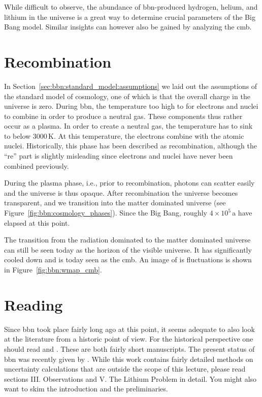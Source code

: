 While difficult to observe, the abundance of \ac{bbn}-produced hydrogen, helium, and lithium in the universe is a great way to determine crucial parameters of the Big Bang model. Similar insights can however also be gained by analyzing the \ac{cmb}.

\section{Recombination}

In Section~\ref{sec:bbn:standard_model:assumptions} we laid out the assumptions of the standard model of cosmology, one of which is that the overall charge in the universe is zero. During \ac{bbn}, the temperature too high to for electrons and nuclei to combine in order to produce a neutral gas. These components thus rather occur as a plasma. In order to create a neutral gas, the temperature has to sink to below $3000$\,K. At this temperature, the electrons combine with the atomic nuclei. Historically, this phase has been described as recombination, although the ``re'' part is slightly misleading since electrons and nuclei have never been combined previously.

During the plasma phase, i.e., prior to recombination, photons can scatter easily and the universe is thus opaque. After recombination the universe becomes transparent, and we transition into the matter dominated universe (see Figure~\ref{fig:bbn:cosmology_phases}). Since the Big Bang, roughly $4\times10^{5}$\,a have elapsed at this point.

The transition from the radiation dominated to the matter dominated universe can still be seen today as the horizon of the visible universe. It has significantly cooled down and is today seen as the \ac{cmb}. An image of is fluctuations is shown in Figure~\ref{fig:bbn:wmap_cmb}.


\section{Reading}

Since \ac{bbn} took place fairly long ago at this point, it seems adequate to also look at the literature from a historic point of view. For the historical perspective one should read \citet{alpher48} and \citet{peebles66prl}. These are both fairly short manuscripts. The present status of \ac{bbn} was recently given by \citet{cyburt16}. While this work contains fairly detailed methods on uncertainty calculations that are outside the scope of this lecture, please read sections III. Observations and V. The Lithium Problem in detail. You might also want to skim the introduction and the preliminaries.

